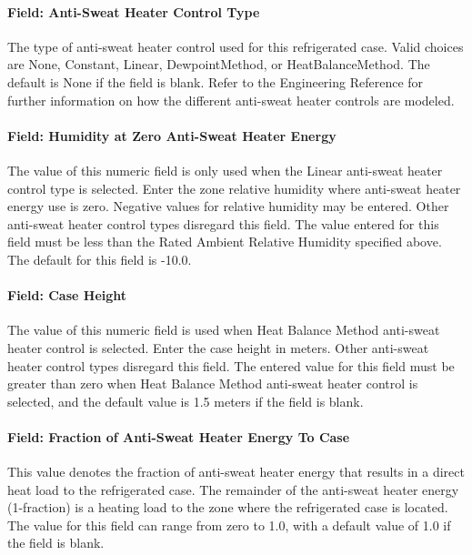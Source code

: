 \paragraph{Field: Anti-Sweat Heater Control Type}\label{field-anti-sweat-heater-control-type}

The type of anti-sweat heater control used for this refrigerated case. Valid choices are None, Constant, Linear, DewpointMethod, or HeatBalanceMethod. The default is None if the field is blank. Refer to the Engineering Reference for further information on how the different anti-sweat heater controls are modeled.

\paragraph{Field: Humidity at Zero Anti-Sweat Heater Energy}\label{field-humidity-at-zero-anti-sweat-heater-energy}

The value of this numeric field is only used when the Linear anti-sweat heater control type is selected. Enter the zone relative humidity where anti-sweat heater energy use is zero. Negative values for relative humidity may be entered. Other anti-sweat heater control types disregard this field. The value entered for this field must be less than the Rated Ambient Relative Humidity specified above. The default for this field is -10.0.

\paragraph{Field: Case Height}\label{field-case-height}

The value of this numeric field is used when Heat Balance Method anti-sweat heater control is selected. Enter the case height in meters. Other anti-sweat heater control types disregard this field. The entered value for this field must be greater than zero when Heat Balance Method anti-sweat heater control is selected, and the default value is 1.5 meters if the field is blank.

\paragraph{Field: Fraction of Anti-Sweat Heater Energy To Case}\label{field-fraction-of-anti-sweat-heater-energy-to-case}

This value denotes the fraction of anti-sweat heater energy that results in a direct heat load to the refrigerated case. The remainder of the anti-sweat heater energy (1-fraction) is a heating load to the zone where the refrigerated case is located. The value for this field can range from zero to 1.0, with a default value of 1.0 if the field is blank.

